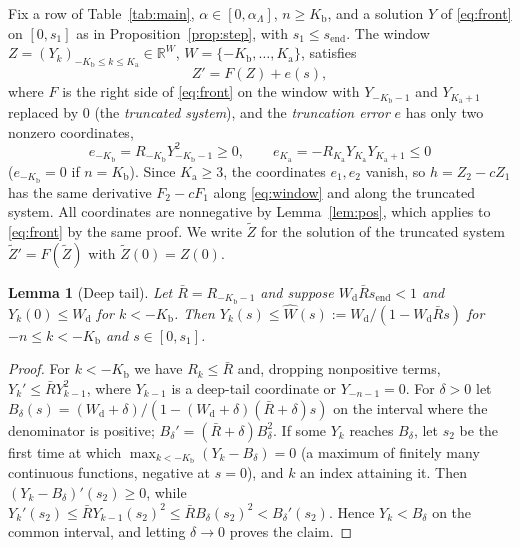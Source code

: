 \documentclass[12pt,reqno]{amsart}
\numberwithin{equation}{section}
\theoremstyle{plain}
\newtheorem{lemma}[theorem]{Lemma}
\theoremstyle{definition}
\theoremstyle{remark}
\newcommand{\Kb}{K_{\mathrm b}}
\newcommand{\Ka}{K_{\mathrm a}}
\newcommand{\send}{s_{\mathrm{end}}}
\newcommand{\Wd}{W_{\mathrm d}}
\newcommand{\R}{\mathbb{R}}
\begin{document}
Fix a row of Table~\ref{tab:main}, $\alpha\in[0,\alpha_\Lambda]$, $n\ge\Kb$, and a solution
$Y$ of \eqref{eq:front} on $[0,s_1]$ as in Proposition~\ref{prop:step}, with
$s_1\le\send$. The window $Z=(Y_k)_{-\Kb\le k\le\Ka}\in\R^{W}$, $W=\{-\Kb,\dots,\Ka\}$,
satisfies
\begin{equation}\label{eq:window}
  Z'=F(Z)+e(s),
\end{equation}
where $F$ is the right side of \eqref{eq:front} on the window with
$Y_{-\Kb-1}$ and $Y_{\Ka+1}$ replaced by $0$ (the \emph{truncated system}), and
the \emph{truncation error} $e$ has only two nonzero coordinates,
\begin{equation}\label{eq:e}
  e_{-\Kb}=R_{-\Kb}Y_{-\Kb-1}^2\ge0,\qquad e_{\Ka}=-R_{\Ka}Y_{\Ka}Y_{\Ka+1}\le0
\end{equation}
($e_{-\Kb}=0$ if $n=\Kb$). Since $\Ka\ge3$, the coordinates $e_1,e_2$ vanish,
so $h=Z_2-cZ_1$ has the same derivative $F_2-cF_1$ along \eqref{eq:window}
and along the truncated system. All coordinates are nonnegative by
Lemma~\ref{lem:pos}, which applies to \eqref{eq:front} by the same proof.
We write $\tilde Z$ for the solution of the truncated system $\tilde Z'=F(\tilde Z)$
with $\tilde Z(0)=Z(0)$.

\begin{lemma}[Deep tail]\label{lem:deep}
Let $\bar R=R_{-\Kb-1}$ and suppose $\Wd\bar R\send<1$ and $Y_k(0)\le\Wd$ for
$k<-\Kb$. Then $Y_k(s)\le\widehat W(s):=\Wd/(1-\Wd\bar Rs)$ for $-n\le k<-\Kb$ and
$s\in[0,s_1]$.
\end{lemma}

\begin{proof}
For $k<-\Kb$ we have $R_k\le\bar R$ and, dropping nonpositive terms,
$Y_k'\le\bar RY_{k-1}^2$, where $Y_{k-1}$ is a deep-tail coordinate or
$Y_{-n-1}=0$. For $\delta>0$ let
$B_\delta(s)=(\Wd+\delta)/(1-(\Wd+\delta)(\bar R+\delta)s)$ on the interval where the
denominator is positive; $B_\delta'=(\bar R+\delta)B_\delta^2$. If some $Y_k$ reaches
$B_\delta$, let $s_2$ be the first time at which $\max_{k<-\Kb}(Y_k-B_\delta)=0$ (a
maximum of finitely many continuous functions, negative at $s=0$), and
$k$ an index attaining it. Then $(Y_k-B_\delta)'(s_2)\ge0$, while
$Y_k'(s_2)\le\bar RY_{k-1}(s_2)^2\le\bar RB_\delta(s_2)^2<B_\delta'(s_2)$. Hence
$Y_k<B_\delta$ on the common interval, and letting $\delta\to0$ proves the claim.
\end{proof}
\end{document}
